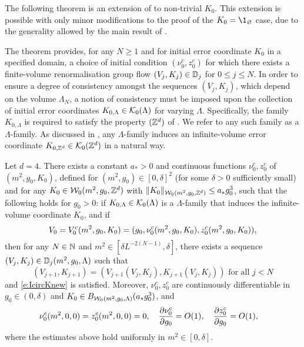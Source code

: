 The following theorem is an extension of \cite[Proposition~\ref{log-prop:flow-flow}]{BBS-saw4-log}
to non-trivial $K_0$.
This extension is possible
with only minor modifications to the proof of the $K_0 = \1_\varnothing$ case,
due to the generality allowed by the main result of \cite{BBS-rg-flow}.

The theorem provides, for any $N \ge 1$ and for initial error coordinate $K_0$
in a specified domain, a choice of initial condition $(\nu_0^c,z_0^c)$
for which there exists
a finite-volume renormalisation group flow $(V_j, K_j) \in \mathbb{D}_j$ for $0 \le j \le N$.
In order to ensure a degree of consistency amongst the sequences $(V_j, K_j)$, which depend on
the volume $\Lambda_N$, a notion of consistency must be imposed upon the collection of initial
error coordinates $K_{0,\Lambda} \in \mathcal{K}_0(\Lambda)$ for varying $\Lambda$.
Specifically, the family $K_{0,\Lambda}$ is required to satisfy the property $({ {{\mathbb Z}}^d })$ of
\cite[Definition~\ref{step-defn:KZd}]{BS-rg-step}.
We refer to any such family as a $\Lambda$-family.
As discussed in \cite[Definition~\ref{step-defn:KZd}]{BS-rg-step},
any $\Lambda$-family
induces an infinite-volume error coordinate $K_{0,{ {{\mathbb Z}}^d }} \in \mathcal{K}_0({ {{\mathbb Z}}^d })$ in a natural way.


\begin{theorem}
\label{thm:flow-flow}
Let $d = 4$.
There exists a constant $a_* > 0$ and continuous functions $\nu_0^c, z_0^c$
of $(m^2, g_0, K_0)$, defined for $(m^2, g_0) \in [0, \delta]^2$
(for some $\delta > 0$ sufficiently small) and for any $K_0 \in \mathcal{W}_0(m^2, g_0, { {{\mathbb Z}}^d })$
with $\|K_0\|_{\mathcal{W}_0(m^2, g_0, { {{\mathbb Z}}^d })} \leq a_* g_0^3$, such that
the following holds for $g_0 > 0$:
if $K_{0,\Lambda} \in \mathcal{K}_0(\Lambda)$ is a $\Lambda$-family
that induces the infinite-volume coordinate $K_0$, and if
\begin{equation}
\label{e:flow-flow-ic}
V_0 = V_0^c(m^2, g_0, K_0) = (g_0, \nu_0^c(m^2,g_0,K_0), z_0^c(m^2,g_0,K_0)),
\end{equation}
then for any $N \in {\mathbb N}$ and $m^2 \in [\delta L^{-2 (N - 1)}, \delta]$,
there exists a sequence $(V_j, K_j) \in \mathbb{D}_j(m^2, g_0, \Lambda)$
such that
\begin{equation}
  \label{e:VjKjDj}
  (V_{j+1},K_{j+1}) = (V_{j+1}(V_j, K_j), K_{j+1}(V_j, K_j)) \text{ for all } j < N
\end{equation}
and \eqref{e:IcircKnew} is satisfied.
Moreover, $\nu_0^c,z_0^c$ are continuously differentiable in
$g_0 \in (0, \delta)$ and $K_0 \in B_{\mathcal{W}_0(m^2, g_0, \Lambda)}(a_* g_0^3)$, and
\begin{align}
&\nu_0^c(m^2,0,0) = z_0^c(m^2,0,0) = 0,
\quad
\frac{\partial \nu_0^c}{\partial g_0} = O(1),
\quad
\label{e:z0est}
\frac{\partial z_0^c}{\partial g_0} = O(1),
\end{align}
where the estimates above hold uniformly in $m^2 \in [0, \delta]$.
\end{theorem}

